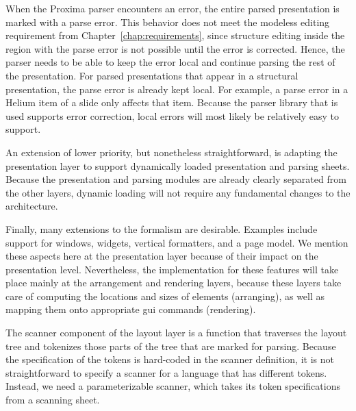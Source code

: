 
When the Proxima parser encounters an error, the entire parsed presentation is marked with a parse error. This behavior does not meet the modeless editing requirement from Chapter~\ref{chap:requirements}, since structure editing inside the region with the parse error is not possible until the error is corrected. Hence, the parser needs to be able to keep the error local and continue parsing the rest of the presentation. For parsed presentations that appear in a structural presentation, the parse error is already kept local. For example, a parse error in a Helium item of a slide only affects that item. Because the parser library that is used supports error correction, local errors will most likely be relatively easy to support. 


An extension of lower priority, but nonetheless straightforward, is adapting the presentation layer to support dynamically loaded presentation and parsing sheets. Because the presentation and parsing modules are already clearly separated from the other layers, dynamic loading will not require any fundamental changes to the architecture.

Finally, many extensions to the  formalism are desirable. Examples include support for windows, widgets, vertical formatters, and a page model. We mention these aspects here at the presentation layer because of their impact on the presentation level. Nevertheless, the implementation for these features will take place mainly at the arrangement and rendering layers, because these layers take care of computing the locations and sizes of {\Xprez} elements (arranging), as well as mapping them onto appropriate gui commands (rendering).


The scanner component of the layout layer is a function that traverses the layout tree and tokenizes those parts of the tree that are marked for parsing. Because the specification of the tokens is hard-coded in the scanner definition, it is not straightforward to specify a scanner for a language that has different tokens. Instead, we need a parameterizable scanner, which takes its token specifications from a scanning sheet.


